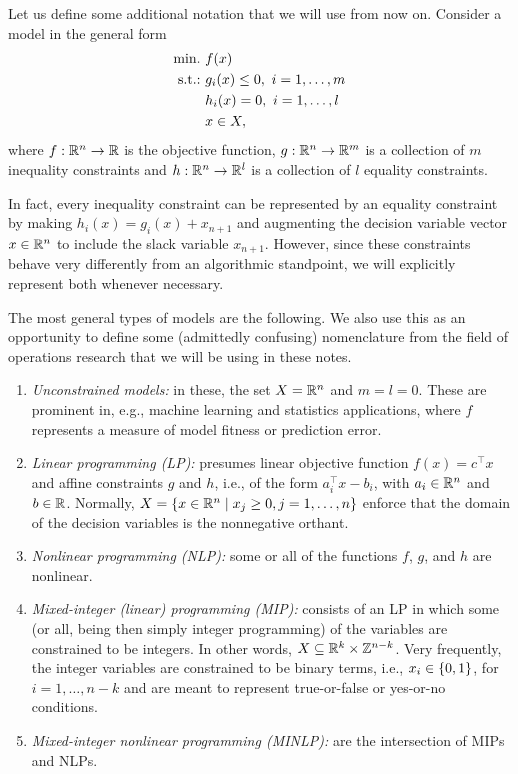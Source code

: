 Let us define some additional notation that we will use from now on. Consider a model in the general form
%
\begin{align*}
	\mathop{\text{min.~}} & f(x) \\
	\mathop{\text{s.t.:~}}   & g_i(x) \leq 0, ~i = 1, \dots, m \\
	      & h_i(x) = 0, ~i = 1, \dots, l \\
	      & x \in X,  
\end{align*}
%
where $f: \mathbb{R}^n \to \mathbb{R}$ is the objective function, $g:\mathbb{R}^n \to \mathbb{R}^m$ is a collection of $m$ inequality constraints and $h: \mathbb{R}^n \to \mathbb{R}^l$ is a collection of $l$ equality constraints.

In fact, every inequality constraint can be represented by an equality constraint by making $h_i(x) = g_i(x) + x_{n+1}$ and augmenting the decision variable vector $x \in \mathbb{R}^n$ to include the slack variable $x_{n+1}$. However, since these constraints behave very differently from an algorithmic standpoint, we will explicitly represent both whenever necessary.

The most general types of models are the following. We also use this as an opportunity to define some (admittedly confusing) nomenclature from the field of operations research that we will be using in these notes.
%
\begin{enumerate}
    \item \emph{Unconstrained models:} in these, the set $X = \mathbb{R}^n$ and $m=l=0$. These are prominent in, e.g., machine learning and statistics applications, where $f$ represents a measure of model fitness or prediction error.  
    \item \emph{Linear programming (LP):} presumes linear objective function $f(x) = c^\top x$ and affine constraints $g$ and $h$, i.e., of the form $a_i^\top x - b_i$, with $a_i \in \mathbb{R}^n$ and $b \in \mathbb{R}$. Normally, $X = \left\{ x \in \mathbb{R}^n \mid x_j \geq 0, j = 1,\dots, n \right \}$ enforce that the domain of the decision variables is the nonnegative orthant.
    \item \emph{Nonlinear programming (NLP):} some or all of the functions $f$, $g$, and $h$ are nonlinear.
    \item \emph{Mixed-integer (linear) programming (MIP):} consists of an LP in which some (or all, being then simply integer programming) of the variables are constrained to be integers. In other words, $X \subseteq \mathbb{R}^k \times \mathbb{Z}^{n-k}$. Very frequently, the integer variables are constrained to be binary terms, i.e., $x_i \in \left\{ 0,1 \right \}$, for $i = 1,\dots, n-k$ and are meant to represent true-or-false or yes-or-no conditions.
    \item \emph{Mixed-integer nonlinear programming (MINLP):} are the intersection of MIPs and NLPs.  
\end{enumerate}

